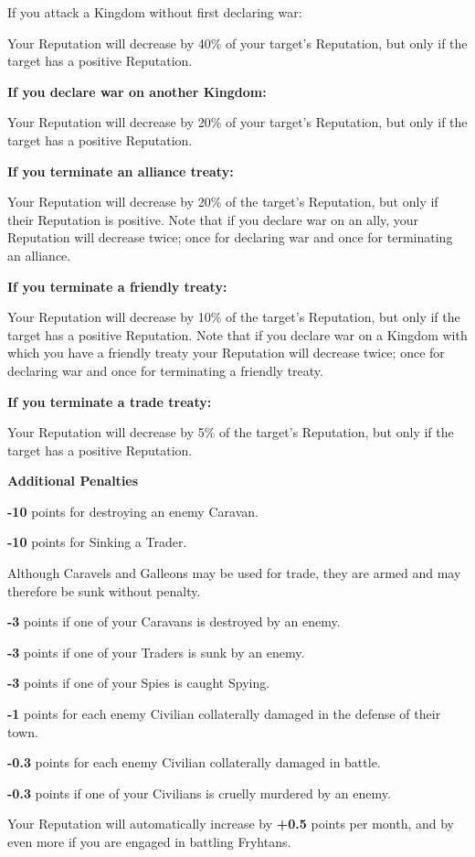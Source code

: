 \begin{adjustwidth}{1cm}{}
If you attack a Kingdom without first declaring war:

Your Reputation will decrease by 40\% of your target’s Reputation, but only if the target has a positive Reputation.

\textbf{If you declare war on another Kingdom:}

Your Reputation will decrease by 20\% of your target’s Reputation, but only if the target has a positive Reputation.

\textbf{If you terminate an alliance treaty:}

Your Reputation will decrease by 20\% of the target’s Reputation, but only if their Reputation is positive. Note that if you declare war on an ally, your Reputation will decrease twice; once for declaring war and once for terminating an alliance.

\textbf{If you terminate a friendly treaty: }

Your Reputation will decrease by 10\% of the target’s Reputation, but only if the target has a positive Reputation. Note that if you declare war on a Kingdom with which you have a friendly treaty your Reputation will decrease twice; once for declaring war and once for terminating a friendly treaty.

\textbf{If you terminate a trade treaty:}

Your Reputation will decrease by 5\% of the target’s Reputation, but
only if the target has a positive Reputation.

\textbf{Additional Penalties}

\textbf{-10} points for destroying an enemy Caravan.

\textbf{-10} points for Sinking a Trader.

Although Caravels and Galleons may be used for trade, they are
armed and may therefore be sunk without penalty.

\textbf{-3} points if one of your Caravans is destroyed by an enemy.

\textbf{-3} points if one of your Traders is sunk by an enemy.

\textbf{-3} points if one of your Spies is caught Spying.

\textbf{-1} points for each enemy Civilian collaterally damaged in the defense of their town.

\textbf{-0.3} points for each enemy Civilian collaterally damaged in battle.

\textbf{-0.3} points if one of your Civilians is cruelly murdered by an enemy.

Your Reputation will automatically increase by \textbf{+0.5} points per month, and by even more if you are engaged in battling Fryhtans.
\end{adjustwidth}

